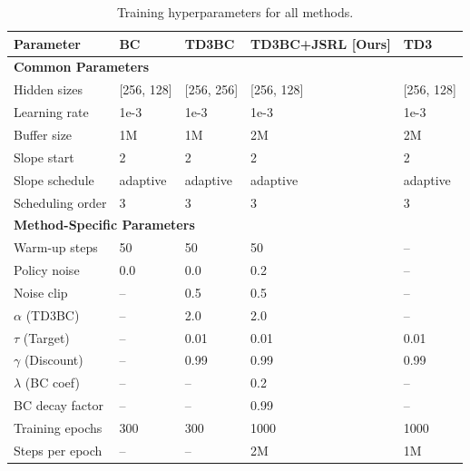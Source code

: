 \begin{table}[htbp]
\centering
\caption{Training hyperparameters for all methods.}
\label{tab:hyperparameters}
\begin{tabular}{lllll}
\toprule
\textbf{Parameter} & \textbf{BC} & \textbf{TD3BC} & \textbf{TD3BC+JSRL} [Ours] & \textbf{TD3} \\
\midrule
\multicolumn{5}{l}{\textbf{Common Parameters}} \\
\midrule
Hidden sizes        & [256, 128] & [256, 256] & [256, 128] & [256, 128] \\
Learning rate       & 1e-3       & 1e-3       & 1e-3       & 1e-3       \\
Buffer size         & 1M         & 1M         & 2M         & 2M         \\
Slope start         & 2          & 2          & 2          & 2          \\
Slope schedule      & adaptive   & adaptive   & adaptive   & adaptive   \\
Scheduling order    & 3          & 3          & 3          & 3          \\
\midrule
\multicolumn{5}{l}{\textbf{Method-Specific Parameters}} \\
\midrule
Warm-up steps       & 50         & 50         & 50         & --         \\
Policy noise        & 0.0        & 0.0        & 0.2        & --         \\
Noise clip          & --         & 0.5        & 0.5        & --         \\
\(\alpha\) (TD3BC)  & --         & 2.0        & 2.0        & --         \\
\(\tau\) (Target)   & --         & 0.01       & 0.01       & 0.01      \\
\(\gamma\) (Discount) & --       & 0.99       & 0.99       & 0.99       \\
\(\lambda\) (BC coef)      & --         & --         & 0.2        & --         \\
BC decay factor     & --         & --         & 0.99       & --         \\
Training epochs     & 300        & 300        & 1000       & 1000        \\
Steps per epoch     & --         & --         & 2M         & 1M         \\
\bottomrule
\end{tabular}
\end{table}
